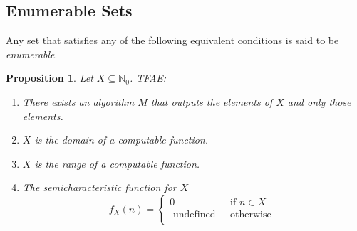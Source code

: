 \documentclass[10pt, letterpaper]{article}
\newcommand{\N}{\mathbb{N}}
\newtheorem{prop}{Proposition}
\theoremstyle{remark}
\theoremstyle{definition}
\begin{document}
\subsection*{Enumerable Sets}

Any set that satisfies any of the following equivalent conditions is said to be \emph{enumerable}.

\begin{prop}
	Let $X \subseteq \N_0$. TFAE:
	\begin{enumerate}
		\item[(a)] There exists an algorithm $M$ that outputs the elements of $X$ and only those elements.
		\item[(b)] $X$ is the domain of a computable function.
		\item[(c)] $X$ is the range of a computable function.
		\item[(d)] The semicharacteristic function for $X$
		\[
			f_X(n) = \begin{cases}
				0 &\text{ if } n \in X \\
				\text{ undefined } &\text{ otherwise } \\
			\end{cases}
		\]
	\end{enumerate}
\end{prop}
\end{document}
